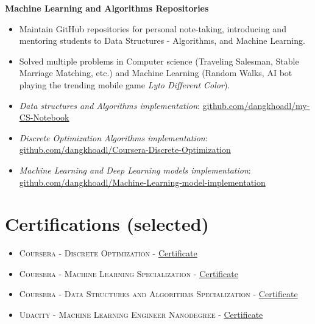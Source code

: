 \documentclass[10pt]{article}
\begin{document}
        \begin{multicols}{1}
            \begin{flushleft}
                \textbf{Machine Learning and Algorithms Repositories}
            \end{flushleft}
        \end{multicols}
        \vspace{-5mm}
        \begin{itemize}[noitemsep]
            \item Maintain GitHub repositories for personal note-taking, introducing and mentoring students to Data Structures - Algorithms, and Machine Learning.
            \item Solved multiple problems in Computer science (Traveling Salesman, Stable Marriage Matching, etc.) and Machine Learning (Random Walks, AI bot playing the trending mobile game \emph{Lyto Different Color}).
            \item \emph{Data structures and Algorithms implementation}: \href{https://github.com/dangkhoadl/my-CS-Notebook}{github.com/dangkhoadl/my-CS-Notebook}
            \item \emph{Discrete Optimization Algorithms implementation}: \href{https://github.com/dangkhoadl/Coursera-Discrete-Optimization}{github.com/dangkhoadl/Coursera-Discrete-Optimization}
            \item \emph{Machine Learning and Deep Learning models implementation}: \href{https://github.com/dangkhoadl/Machine-Learning-model-implementation}{github.com/dangkhoadl/Machine-Learning-model-implementation}
        \end{itemize}
        \vspace{-2mm}

    \vspace{2mm}
    \section{Certifications (selected)}
    \begin{itemize}[noitemsep,leftmargin=*]
        \item \textsc{Coursera - Discrete Optimization - } \href{https://www.coursera.org/account/accomplishments/verify/YXTNUBC3G3LX}{Certificate}
        \item \textsc{Coursera - Machine Learning Specialization - } \href{https://www.coursera.org/account/accomplishments/specialization/3P6TZYWVJKHY}{Certificate}
        \item \textsc{Coursera - Data Structures and Algorithms Specialization - } \href{https://www.coursera.org/account/accomplishments/specialization/AKFYZQ9QD8XH}{Certificate}
        \item \textsc{Udacity - Machine Learning Engineer Nanodegree - } \href{https://graduation.udacity.com/confirm/HK9JLR3N}{Certificate}
    \end{itemize}
\end{document}

